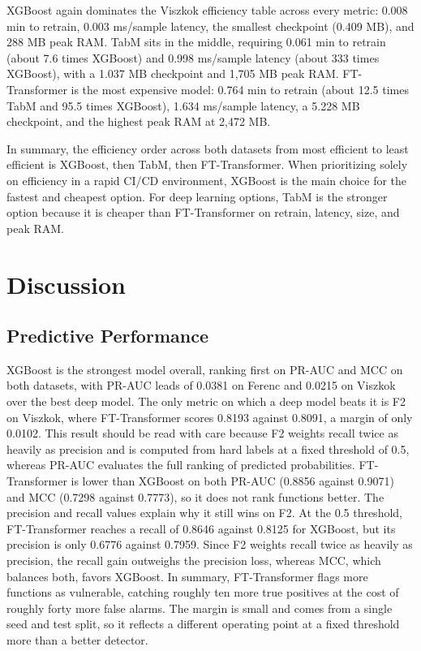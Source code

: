 XGBoost again dominates the Viszkok efficiency table across every metric: 0.008 min to retrain, 0.003 ms/sample latency, the smallest checkpoint (0.409 MB), and 288 MB peak RAM. TabM sits in the middle, requiring 0.061 min to retrain (about 7.6 times XGBoost) and 0.998 ms/sample latency (about 333 times XGBoost), with a 1.037 MB checkpoint and 1,705 MB peak RAM. FT-Transformer is the most expensive model: 0.764 min to retrain (about 12.5 times TabM and 95.5 times XGBoost), 1.634 ms/sample latency, a 5.228 MB checkpoint, and the highest peak RAM at 2,472 MB.


In summary, the efficiency order across both datasets from most efficient to least efficient is XGBoost, then TabM, then FT-Transformer. When prioritizing solely on efficiency in a rapid CI/CD environment, XGBoost is the main choice for the fastest and cheapest option. For deep learning options, TabM is the stronger option because it is cheaper than FT-Transformer on retrain, latency, size, and peak RAM.

\section{Discussion}

\subsection{Predictive Performance}

XGBoost is the strongest model overall, ranking first on PR-AUC and MCC on both datasets, with PR-AUC leads of 0.0381 on Ferenc and 0.0215 on Viszkok over the best deep model. The only metric on which a deep model beats it is F2 on Viszkok, where FT-Transformer scores 0.8193 against 0.8091, a margin of only 0.0102. This result should be read with care because F2 weights recall twice as heavily as precision and is computed from hard labels at a fixed threshold of 0.5, whereas PR-AUC evaluates the full ranking of predicted probabilities. FT-Transformer is lower than XGBoost on both PR-AUC (0.8856 against 0.9071) and MCC (0.7298 against 0.7773), so it does not rank functions better. The precision and recall values explain why it still wins on F2. At the 0.5 threshold, FT-Transformer reaches a recall of 0.8646 against 0.8125 for XGBoost, but its precision is only 0.6776 against 0.7959. Since F2 weights recall twice as heavily as precision, the recall gain outweighs the precision loss, whereas MCC, which balances both, favors XGBoost. In summary, FT-Transformer flags more functions as vulnerable, catching roughly ten more true positives at the cost of roughly forty more false alarms. The margin is small and comes from a single seed and test split, so it reflects a different operating point at a fixed threshold more than a better detector. 

